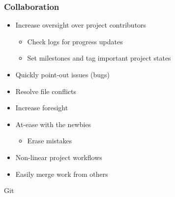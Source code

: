 \begin{frame}\frametitle{Collaboration}
    \begin{itemize}
        \item Increase oversight over project contributors
        \begin{itemize}
            \item Check logs for progress updates
            \item Set milestones and tag important project
            states
        \end{itemize}
        \item Quickly point-out issues (bugs)
        \item Resolve file conflicts
        \item Increase foresight
        \item At-ease with the newbies
        \begin{itemize}
            \item Erase mistakes
        \end{itemize}
        \item Non-linear project workflows
        \item Easily merge work from others
    \end{itemize}
\end{frame}

\begin{frame}[c]
    \begin{center}
        \Large Git
    \end{center}
\end{frame}